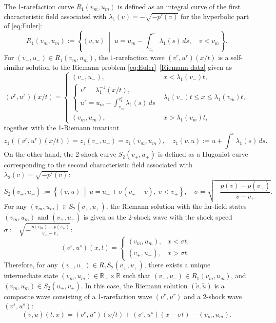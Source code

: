 \documentclass[11pt,reqno]{amsart}
\begin{document}
The 1-rarefaction curve $ R_1(v_m,u_m) $ is defined as an integral curve of the first characteristic field associated with $ \lambda_1(v) = -\sqrt{-p'(v)} $ for the hyperbolic part of \eqref{eq:Euler}:
\[
R_1(v_m,u_m) := \left\{ (v, u) \;\middle|\; u = u_m - \int_{v_m}^v \lambda_1(s) \, ds, \quad v < v_m \right\}.
\]
For $ (v_-,u_-) \in R_1(v_m,u_m)$, the $ 1 $-rarefaction wave $ (v^r, u^r)(x/t) $ is a self-similar solution to the Riemann problem \eqref{eq:Euler}--\eqref{Riemann-data} given as
\begin{equation}\label{eq:rarefaction wave}
(v^r, u^r)(x/t) =
\begin{cases}
(v_-,u_-), & x < \lambda_1(v_-)t, \\ 
\begin{cases}
v^r = \lambda_1^{-1}(x/t), \\ 
u^r = u_m - \int_{v_m}^{v_1^r} \lambda_1(s) \, ds
\end{cases}
& \lambda_1(v_-)t \leq x \leq \lambda_1(v_m)t, \\ 
(v_m,u_m), & x > \lambda_1(v_m)t,
\end{cases}
\end{equation}
together with the 1-Riemann invariant
\begin{equation*}
     z_1((v^r, u^r)(x/t))=z_1(v_-,u_-)=z_1(v_m,u_m), \quad z_1(v,u):=u+\int^v\lambda_1(s)\,ds.
\end{equation*}
On the other hand, the 2-shock curve $ S_2(v_+,u_+) $ is defined as a Hugoniot curve corresponding to the second characteristic field associated with $\lambda_2(v)=\sqrt{-p'(v)}$:
\[
S_2(v_+,u_+) := \left\{ (v, u) ~\middle|~ u = u_+ + \sigma (v_+ - v), \; v < v_+ \right\},\quad \sigma = \sqrt{-\frac{p(v) - p(v_+)}{v - v_+}} .
\]
For any $ (v_m,u_m) \in S_2(v_+,u_+) $, the Riemann solution with the far-field states $(v_m,u_m)$ and $(v_+,u_+)$ is given as the 2-shock wave with the shock speed $\sigma := \sqrt{-\frac{p(v_m)-p(v_+)}{v_m-v_+}}$:
\begin{equation} \label{eq:shock wave}
(v^s, u^s)(x, t) =
\begin{cases}
(v_m,u_m), & x < \sigma t, \\ 
(v_+,u_+), & x > \sigma t.
\end{cases}
\end{equation}
Therefore, for any $(v_-,u_-) \in R_1S_2(v_+,u_+)$, there exists a unique intermediate state $(v_m,u_m)\in \mathbb{R}_+ \times \mathbb{R}$ such that $(v_-,u_-) \in R_1(v_m,u_m)$, and $(v_m,u_m) \in S_2(u_+,v_+)$. In this case, the Riemann solution $(\tilde{v},\tilde{u})$ is a composite wave consisting of a 1-rarefaction wave $(v^r,u^r)$ and a 2-shock wave $(v^s,u^s)$:
\[(\tilde{v},\tilde{u})(t,x)=(v^r,u^r)(x/t)+(v^s,u^s)(x-\sigma t)-(v_m,u_m).\]
\end{document}
